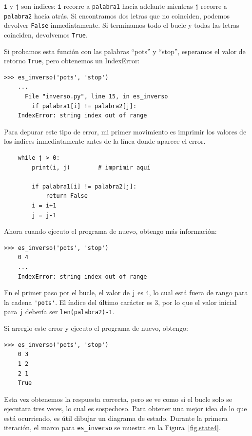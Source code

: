 \documentclass[10pt]{book}
\begin{document}
{\tt i} y {\tt j} son índices: {\tt i} recorre a {\tt palabra1}
hacia adelante mientras {\tt j} recorre a {\tt palabra2} hacia atrás.  Si encontramos
dos letras que no coinciden, podemos devolver {\tt False} inmediatamente.
Si terminamos todo el bucle y todas las letras coinciden,
devolvemos {\tt True}.

Si probamos esta función con las palabras ``pots'' y ``stop'',
esperamos el valor de retorno {\tt True}, pero obtenemos un IndexError:

\begin{verbatim}
>>> es_inverso('pots', 'stop')
    ...
      File "inverso.py", line 15, in es_inverso
        if palabra1[i] != palabra2[j]:
    IndexError: string index out of range
\end{verbatim}
%
Para depurar este tipo de error, mi primer movimiento es
imprimir los valores de los índices inmediatamente antes de la línea
donde aparece el error.

\begin{verbatim}
    while j > 0:
        print(i, j)        # imprimir aquí

        if palabra1[i] != palabra2[j]:
            return False
        i = i+1
        j = j-1
\end{verbatim}
%
Ahora cuando ejecuto el programa de nuevo, obtengo más información:

\begin{verbatim}
>>> es_inverso('pots', 'stop')
    0 4
    ... 
    IndexError: string index out of range
\end{verbatim}
%
En el primer paso por el bucle, el valor de {\tt j} es 4,
lo cual está fuera de rango para la cadena \verb"'pots'".
El índice del último carácter es 3, por lo que el
valor inicial para {\tt j} debería ser {\tt len(palabra2)-1}.

Si arreglo este error y ejecuto el programa de nuevo, obtengo:

\begin{verbatim}
>>> es_inverso('pots', 'stop')
    0 3
    1 2
    2 1
    True
\end{verbatim}
%
Esta vez obtenemos la respuesta correcta, pero se ve como si el bucle solo se ejecutara
tres veces, lo cual es sospechoso.  Para obtener una mejor idea de lo que está
ocurriendo, es útil dibujar un diagrama de estado.  Durante la primera
iteración, el marco para \verb"es_inverso" se muestra en la
Figura~\ref{fig.state4}.   
\end{document}
